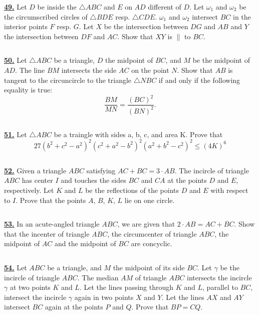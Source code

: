 \documentclass{article}
\begin{document}
$$ $$


\href{ http://www.artofproblemsolving.com/Forum/viewtopic.php?p=519895#p519895
}{\bf 49.} Let $D$ be inside the $\triangle ABC$ and $E$ on $AD$ different of $D$. Let $\omega_1$ and $\omega_2$ be the circumscribed circles of $\triangle BDE$ resp. $\triangle CDE$. $\omega_1$ and $\omega_2$ intersect $BC$ in the interior points $F$ resp. $G$. Let $X$ be the intersection between $DG$ and $AB$ and $Y$ the intersection between $DF$ and $AC$. Show that $XY$ is $\|$ to $BC$.


$$ $$


\href{ http://www.artofproblemsolving.com/Forum/viewtopic.php?p=493656#p493656
}{\bf 50.} Let $\triangle{ABC}$ be a triangle, $D$ the midpoint of $BC$, and $M$ be the midpoint of $AD$. The line $BM$ intersects the side $AC$ on the point $N$. Show that $AB$ is tangent to the circuncircle to the triangle $\triangle{NBC}$ if and only if the following equality is true:
$$\frac{{BM}}{{MN}} =\frac{({BC})^2}{({BN})^2}.$$





$$ $$

\href{ http://www.artofproblemsolving.com/Forum/viewtopic.php?p=480525#p480525
}{\bf 51.} Let $\triangle ABC$ be a traingle with sides a, b, c, and area K. Prove that
$$ 27 (b^2 + c^2 - a^2)^2 (c^2 + a^2 - b^2)^2 (a^2 + b^2 - c^2)^2 \le (4K)^6$$



$$ $$

\href{ http://www.artofproblemsolving.com/Forum/viewtopic.php?p=439274#p439274
}{\bf 52.} Given a triangle $ABC$ satisfying $AC+BC=3\cdot AB$. The incircle of triangle $ABC$ has center $I$ and touches the sides $BC$ and $CA$ at the points $D$ and $E$, respectively. Let $K$ and $L$ be the reflections of the points $D$ and $E$ with respect to $I$. Prove that the points $A$, $B$, $K$, $L$ lie on one circle.


$$ $$


\href{http://www.artofproblemsolving.com/Forum/viewtopic.php?p=476117#p476117
 }{\bf 53.} In an acute-angled triangle $ABC$, we are given that $2\cdot AB = AC + BC$. Show that the incenter of triangle $ABC$, the circumcenter of triangle $ABC$, the midpoint of $AC$ and the midpoint of $BC$ are concyclic.

$$ $$


\href{http://www.artofproblemsolving.com/Forum/viewtopic.php?p=463068#p463068
 }{\bf 54.} Let $ABC$ be a triangle, and $M$ the midpoint of its side $BC$. Let $\gamma$ be the incircle of triangle $ABC$. The median $AM$ of triangle $ABC$ intersects the incircle $\gamma$ at two points $K$ and $L$. Let the lines passing through $K$ and $L$, parallel to $BC$, intersect the incircle $\gamma$ again in two points $X$ and $Y$. Let the lines $AX$ and $AY$ intersect $BC$ again at the points $P$ and $Q$. Prove that $BP = CQ$.
\end{document}
